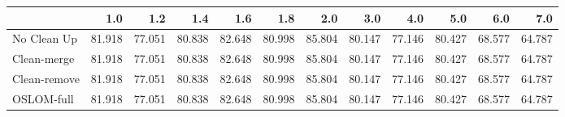 \begin{tabular}{lrrrrrrrrrrr}
\toprule
{} &    1.0 &    1.2 &    1.4 &    1.6 &    1.8 &    2.0 &    3.0 &    4.0 &    5.0 &    6.0 &    7.0 \\
\midrule
No Clean Up  & 81.918 & 77.051 & 80.838 & 82.648 & 80.998 & 85.804 & 80.147 & 77.146 & 80.427 & 68.577 & 64.787 \\
Clean-merge  & 81.918 & 77.051 & 80.838 & 82.648 & 80.998 & 85.804 & 80.147 & 77.146 & 80.427 & 68.577 & 64.787 \\
Clean-remove & 81.918 & 77.051 & 80.838 & 82.648 & 80.998 & 85.804 & 80.147 & 77.146 & 80.427 & 68.577 & 64.787 \\
OSLOM-full   & 81.918 & 77.051 & 80.838 & 82.648 & 80.998 & 85.804 & 80.147 & 77.146 & 80.427 & 68.577 & 64.787 \\
\bottomrule
\end{tabular}
